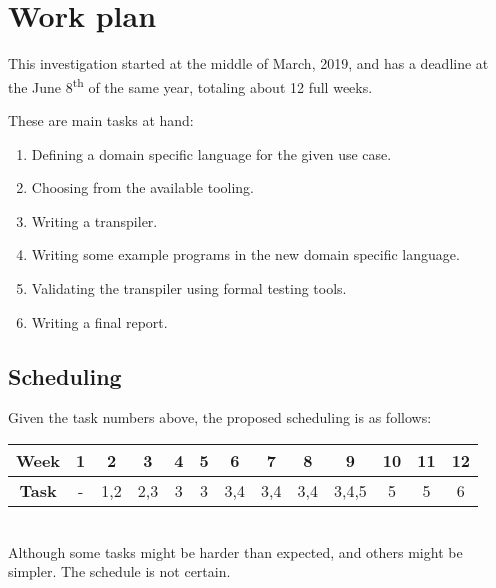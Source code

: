 \documentclass[runningheads]{llncs}
\begin{document}
\section{Work plan}
This investigation started at the middle of March, 2019, and has a deadline at the June 8\textsuperscript{th} of the same year, totaling about 12 full weeks.
\par These are main tasks at hand:
\begin{enumerate}
	\item Defining a domain specific language for the given use case.
	\item Choosing from the available tooling.
	\item Writing a transpiler.
	\item Writing some example programs in the new domain specific language.
	\item Validating the transpiler using formal testing tools.
	\item Writing a final report.
\end{enumerate}
\subsection{Scheduling}
Given the task numbers above, the proposed scheduling is as follows:
\begin{table}
\centering
\begin{tabular}{c|c|c|c|c|c|c|c|c|c|c|c|c}
\hline
\textbf{Week} & 1 & 2   & 3   & 4 & 5 & 6   & 7   & 8   & 9     & 10 & 11 & 12 \\ \hline
\textbf{Task} & - & 1,2 & 2,3 & 3 & 3 & 3,4 & 3,4 & 3,4 & 3,4,5 & 5  & 5  & 6  \\ \hline
\end{tabular}
\end{table}\\
Although some tasks might be harder than expected, and others might be simpler. The schedule is not certain.



\end{document}

